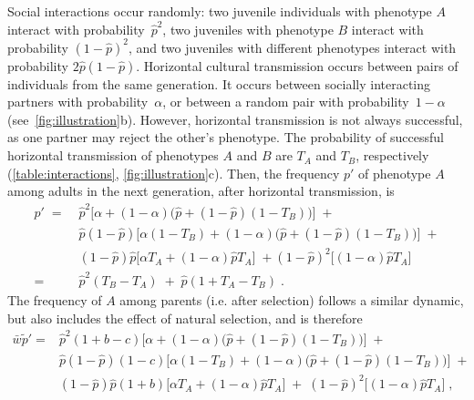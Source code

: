 \documentclass[12pt]{extarticle}
\begin{document}
Social interactions occur randomly:
two juvenile individuals with phenotype $A$ interact with probability~$\hat{p}^2$, two juveniles with phenotype $B$ interact with probability $(1-\hat{p})^2$, and two juveniles with different phenotypes interact with probability $2\hat{p}(1-\hat{p})$. 
Horizontal cultural transmission occurs between pairs of individuals from the same generation. 
It occurs between socially interacting partners with probability~$\alpha$, or between a random pair with probability~$1-\alpha$ (see~\autoref{fig:illustration}b).
However, horizontal transmission is not always successful, as one partner may reject the other's phenotype.
The probability of successful horizontal transmission of phenotypes $A$ and $B$ are $T_A$ and $T_B$, respectively (\autoref{table:interactions}, \autoref{fig:illustration}c).
Then, the frequency $p'$ of phenotype $A$ among adults in the next generation, after horizontal transmission, is 
\begin{equation}\label{eq:nextgen_adults}
\begin{aligned}
p' \;= \;
& \hat{p}^2 \big[\alpha + (1-\alpha)\big(\hat{p} + (1-\hat{p})(1-T_B)\big)\big] \;+ \\
& \hat{p}(1-\hat{p}) \big[\alpha(1-T_B) + (1-\alpha)\big(\hat{p} + (1-\hat{p})(1-T_B)\big)\big] \;+ \\
& (1-\hat{p})\hat{p} \big[\alpha T_A + (1-\alpha) \hat{p} T_A \big] \;+ 
(1-\hat{p})^2 \big[(1-\alpha) \hat{p} T_A \big] \\
=\; & \hat{p}^2(T_B-T_A) \;+\; \hat{p}(1+T_A-T_B) \;.
\end{aligned}
\end{equation}
The frequency of $A$ among parents (i.e. after selection) follows a similar dynamic, but also includes the effect of natural selection, and is therefore
\begin{equation}\label{eq:nextgen_parents}
\begin{aligned}
\bar{w} \tilde{p}' =
& \hat{p}^2 (1+b-c) \big[\alpha + (1-\alpha)\big(\hat{p} + (1-\hat{p})(1-T_B)\big)\big] \;+ \\
& \hat{p}(1-\hat{p}) (1-c) \big[\alpha(1-T_B) + (1-\alpha)\big(\hat{p} + (1-\hat{p})(1-T_B)\big)\big] \;+ \\
& (1-\hat{p})\hat{p} (1+b) \big[\alpha T_A + (1-\alpha) \hat{p} T_A \big] \;+\; 
(1-\hat{p})^2 \big[(1-\alpha) \hat{p} T_A \big] \;,
\end{aligned}
\end{equation}
\end{document}
